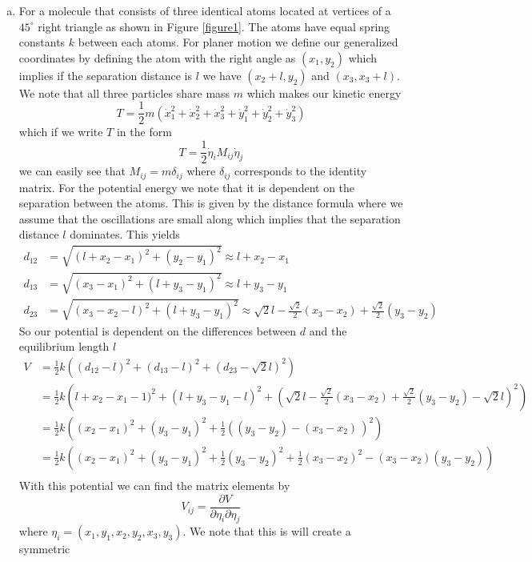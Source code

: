 \documentclass[11pt]{article}
\numberwithin{equation}{section}
\begin{document}
\begin{enumerate}[(a)]
\item For a molecule that consists of three identical atoms located at vertices of a $45^{\circ}$ 
right triangle as shown in Figure \ref{figure1}. The atoms have equal spring constants $k$ 
between each atoms. For planer motion we 
define our generalized coordinates by defining the atom with the right angle as $(x_1,y_2)$ 
which implies if the separation distance is $l$ we have $(x_2+l,y_2)$ and $(x_3,x_3+l)$. We
note that all three particles share mass $m$ which makes our kinetic energy
$$T = \frac{1}{2}m\left(\dot{x}_1^2+\dot{x}_2^2+\dot{x}_3^2+\dot{y}_1^2+\dot{y}_2^2+\dot{y}_3^2\right)$$
which if we write $T$ in the form 
$$T = \frac{1}{2}\dot{\eta}_iM_{ij}\dot{\eta}_j$$
we can easily see that $M_{ij} = m\delta_{ij}$ where $\delta_{ij}$ corresponds to the 
identity matrix. For the potential energy we note that it is dependent on the separation 
between the atoms. This is given by the distance formula where we assume that the oscillations
are small along which implies that the separation distance $l$ dominates. This yields 
\begin{align*}
d_{12} &= \sqrt{(l+x_2-x_1)^2+(y_2-y_1)^2} \approx l+x_2-x_1\\
d_{13} &= \sqrt{(x_3-x_1)^2+(l+y_3-y_1)^2} \approx l+y_3-y_1\\
d_{23} &= \sqrt{(x_3-x_2-l)^2+(l+y_3-y_1)^2} \approx \sqrt{2}l - \frac{\sqrt{2}}{2}(x_3-x_2) + \frac{\sqrt{2}}{2}(y_3-y_2)
\end{align*}
So our potential is dependent on the differences between $d$ and the equilibrium length $l$
\begin{align*}
V &= \frac{1}{2}k\left((d_{12}-l)^2 + (d_{13}-l)^2 + (d_{23}-\sqrt{2}l)^2 \right)\\
&= \frac{1}{2}k\left(l+x_2-x_1-1)^2 + (l+y_3-y_1-l)^2 + \left(\sqrt{2}l-\frac{\sqrt{2}}{2}(x_3-x_2)+\frac{\sqrt{2}}{2}(y_3-y_2)-\sqrt{2}l\right)^2 \right)\\
&= \frac{1}{2}k\left((x_2-x_1)^2 + (y_3-y_1)^2 + \frac{1}{2}\left((y_3-y_2)-(x_3-x_2)\frac{}{}\right)^2 \right)\\
&= \frac{1}{2}k\left((x_2-x_1)^2 + (y_3-y_1)^2 + \frac{1}{2}(y_3-y_2)^2 + \frac{1}{2}(x_3-x_2)^2 - (x_3-x_2)(y_3-y_2)\right)\\
\end{align*}
With this potential we can find the matrix elements by
$$V_{ij} = \frac{\partial V}{\partial\eta_i\partial\eta_j}$$
where $\eta_i = (x_1,y_1,x_2,y_2,x_3,y_3)$. We note that this is will create a symmetric 

\end{enumerate}
\end{document}
